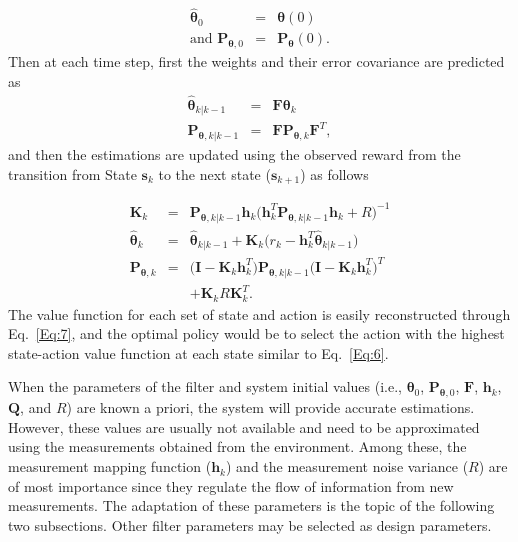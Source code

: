 \documentclass{ieeeaccess}
\def\k{_{k}}
\def\nk{_{k+1}}
\def\bt{\bm{\theta}}
\def\h{\bm{h}}
\def\I{\bm{I}}
\def\Q{\bm{Q}}
\def\K{\bm{K}}
\def\P{\bm{P}}
\def\F{\bm{F}}
\def\s{\bm{s}}
\def\kpk{_{k|k-1}}
\begin{document}
%
\begin{eqnarray}
\hat{\bt}_0 &=& \bt(0)\\
\text{and } \P_{\bt,0} &=& \P_{\bt}(0).
\end{eqnarray}
%
Then at each time step, first the weights and their error covariance are predicted as
%
\begin{eqnarray}
\hat{\bt}\kpk &=& \F\bt\k\\
\P_{\bt,k|k-1} &=& \F\P_{\bt,k}\F^T,
\end{eqnarray}
%
and then the estimations are updated using the observed reward from the transition from State $\s\k$ to the next state ($\s\nk$) as follows

%
\begin{eqnarray}
\K\k &\!\!=\!\!& \P_{\bt,k|k-1} \h\k\big(\h\k^T\P_{\bt, k|k-1}\h\k +R \big)^{-1}\label{Eq:18}\\
 \hat{\bt}\k &\!\!=\!\!& \hat{\bt}\kpk + \K\k\big(r\k - \h^T\k\hat{\bt}\kpk \big)\label{Eq:19}\\
\P_{\bt,k} &\!\!=\!\!& \big(\I - \K\k\h^T\k\big)\P_{\bt, k|k-1}\big(\I - \K\k\h^T\k\big)^T \label{Eq:20} \\&&
+\K\k R\K^T\k.\nonumber
\end{eqnarray}
%
The value function for each set of state and action is easily reconstructed through Eq.~\eqref{Eq:7}, and the optimal policy would be to select the action with the highest state-action value function at each state similar to Eq.~\eqref{Eq:6}.

When the parameters of the filter and system initial values (i.e., $\bt_0$, $\P_{\bt,0}$, $\F$, $\h\k$, $\Q$, and $R$) are known a priori, the system will provide accurate estimations. However, these values are usually not available and need to be approximated using the measurements obtained from the environment. Among these, the measurement mapping function ($\h\k$) and the measurement noise variance ($R$) are of most importance since they regulate the flow of information from new measurements. The adaptation of these parameters is the topic of the following two subsections. Other filter parameters may be selected as design parameters.
\end{document}
